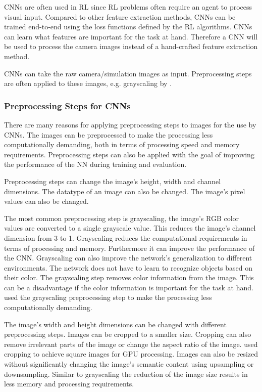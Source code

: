 \acp{CNN} are often used in \ac{RL} since RL problems often require an agent to process visual input. Compared to other feature extraction methods, \acp{CNN} can be trained end-to-end using the loss functions defined by the \ac{RL} algorithms. \acp{CNN} can learn what features are important for the task at hand.
Therefore a \ac{CNN} will be used to process the camera images instead of a hand-crafted feature extraction method. 

\acp{CNN} can take the raw camera/simulation images as input. Preprocessing steps are often applied to these images, e.g. grayscaling by \textcite{atari}. 



\subsubsection{Preprocessing Steps for \acp{CNN}}

There are many reasons for applying preprocessing steps to images for the use by \acp{CNN}. The images can be preprocessed to make the processing less computationally demanding, both in terms of processing speed and memory requirements. Preprocessing steps can also be applied with the goal of improving the performance of the \ac{NN} during training and evaluation. 

Preprocessing steps can change the image's height, width and channel dimensions. The datatype of an image can also be changed. The image's pixel values can also be changed.

The most common preprocessing step is grayscaling, the image's RGB color values are converted to a single grayscale value. This reduces the image's channel dimension from 3 to 1. Grayscaling reduces the computational requirements in terms of processing and memory. Furthermore it can improve the performance of the \ac{CNN}. Grayscaling can also improve the network's generalization to different environments. The network does not have to learn to recognize objects based on their color. The grayscaling step removes color information from the image. This can be a disadvantage if the color information is important for the task at hand.
\textcite{atari} used the grayscaling preprocessing step to make the processing less computationally demanding. 


The image's width and height dimensions can be changed with different preprocessing steps. Images can be cropped to a smaller size. Cropping can also remove irrelevant parts of the image or change the aspect ratio of the image. \textcite{atari} used cropping to achieve square images for GPU processing. Images can also be resized without significantly changing the image's semantic content using upsampling or downsampling. Similar to grayscaling the reduction of the image size results in less memory and processing requirements.

